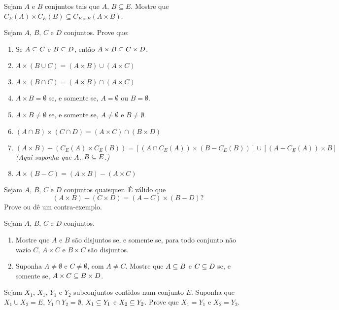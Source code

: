 \documentclass[12pt]{exam}
\begin{document}
\newpage

\questao{} Sejam $A$ e $B$ conjuntos tais que $A$, $B \subseteq E$. Mostre que $C_E(A) \times C_E(B) \subseteq C_{E \times E}(A \times B)$.

\vspace{.3cm}

\questao{} Sejam $A$, $B$, $C$ e $D$ conjuntos. Prove que:
\begin{enumerate}[label={\alph*})]
    \item Se $A \subseteq C$ e $B \subseteq D$, ent\~ao $A \times B \subseteq C \times D$.

    \item $A \times (B \cup C) = (A \times B) \cup (A \times C)$

    \item $A \times (B \cap C) = (A \times B) \cap (A \times C)$

    \item $A \times B = \emptyset$ se, e somente se, $A = \emptyset$ ou $B = \emptyset$.

    \item $A \times B \ne \emptyset$ se, e somente se, $A \ne \emptyset$ e $B \ne \emptyset$.

    \item $(A \cap B) \times (C \cap D) = (A \times C) \cap (B \times D)$

    \item $(A \times B) - (C_E(A) \times C_E(B)) = [(A \cap C_E(A)) \times (B - C_E(B))] \cup [(A - C_E(A)) \times B]$  \textit{(Aqui suponha que $A$, $B \subseteq E$.)}

    \item $A \times (B - C) = (A \times B) - (A \times C)$
\end{enumerate}

\vspace{.3cm}

\questao{} Sejam $A$, $B$, $C$ e $D$ conjuntos quaisquer. É válido que
\[
    (A \times B) - (C \times D) = (A - C) \times (B - D)?
\]
Prove ou dê um contra-exemplo.

\vspace{.3cm}

\questao{} Sejam $A$, $B$, $C$ e $D$ conjuntos.
\begin{enumerate}[label={\alph*})]
    \item Mostre que $A$ e $B$ s\~ao disjuntos se, e somente se, para todo conjunto n\~ao vazio $C$, $A \times C$ e $B \times C$ s\~ao disjuntos.

    \item Suponha $A \ne \emptyset$ e $C \ne \emptyset$, com $A \ne C$. Mostre que $A \subseteq B$ e $C \subseteq D$ se, e somente se, $A \times C \subseteq B \times D$.
\end{enumerate}

\vspace{.3cm}

\questao{} Sejam $X_1$, $X_1$, $Y_1$ e $Y_2$ subconjuntos contidos num conjunto $E$. Suponha que $X_1 \cup X_2 = E$, $Y_1 \cap Y_2 = \emptyset$, $X_1 \subseteq Y_1$ e $X_2 \subseteq Y_2$. Prove que $X_1 = Y_1$ e $X_2 = Y_2$.
\end{document}
